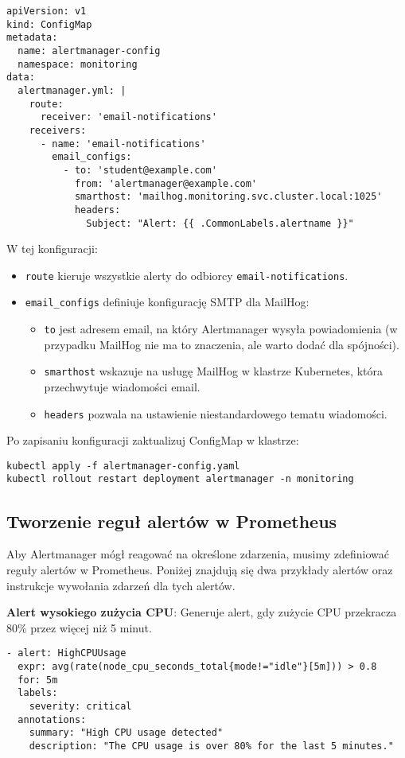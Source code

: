 \documentclass{article}
\begin{document}
\begin{lstlisting}
apiVersion: v1
kind: ConfigMap
metadata:
  name: alertmanager-config
  namespace: monitoring
data:
  alertmanager.yml: |
    route:
      receiver: 'email-notifications'
    receivers:
      - name: 'email-notifications'
        email_configs:
          - to: 'student@example.com'
            from: 'alertmanager@example.com'
            smarthost: 'mailhog.monitoring.svc.cluster.local:1025'
            headers:
              Subject: "Alert: {{ .CommonLabels.alertname }}"
\end{lstlisting}

W tej konfiguracji:
\begin{itemize}
\item \texttt{route} kieruje wszystkie alerty do odbiorcy \texttt{email-notifications}.
\item \texttt{email\_configs} definiuje konfigurację SMTP dla MailHog:
  \begin{itemize}
    \item \texttt{to} jest adresem email, na który Alertmanager wysyła powiadomienia (w przypadku MailHog nie ma to znaczenia, ale warto dodać dla spójności).
    \item \texttt{smarthost} wskazuje na usługę MailHog w klastrze Kubernetes, która przechwytuje wiadomości email.
    \item \texttt{headers} pozwala na ustawienie niestandardowego tematu wiadomości.
    \end{itemize}
\end{itemize}
Po zapisaniu konfiguracji zaktualizuj ConfigMap w klastrze:

\begin{lstlisting}
kubectl apply -f alertmanager-config.yaml
kubectl rollout restart deployment alertmanager -n monitoring
\end{lstlisting}

\subsection{Tworzenie reguł alertów w Prometheus}

Aby Alertmanager mógł reagować na określone zdarzenia, musimy zdefiniować reguły alertów w Prometheus. Poniżej znajdują się dwa przykłady alertów oraz instrukcje wywołania zdarzeń dla tych alertów.

\textbf{Alert wysokiego zużycia CPU}: Generuje alert, gdy zużycie CPU przekracza 80\% przez więcej niż 5 minut.
\begin{lstlisting}
- alert: HighCPUUsage
  expr: avg(rate(node_cpu_seconds_total{mode!="idle"}[5m])) > 0.8
  for: 5m
  labels:
    severity: critical
  annotations:
    summary: "High CPU usage detected"
    description: "The CPU usage is over 80% for the last 5 minutes."
\end{lstlisting}
\end{document}
